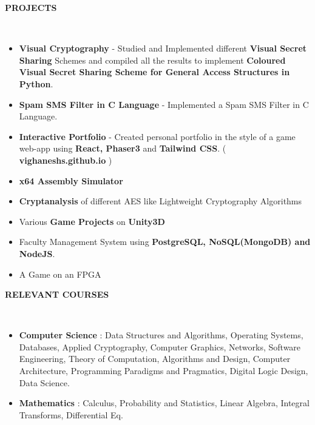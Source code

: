 \documentclass[a4paper,10pt]{article}
\newcommand{\lsep}{-0.6cm}
\newcommand{\resheading}[1]{{\small \colorbox{mygrey}{\begin{minipage}{0.975\textwidth}{\textbf{#1 \vphantom{p\^{E}}}}\end{minipage}}}}
\begin{document}
\resheading{\textbf{PROJECTS} }\\[\lsep]
\vspace{1.0pt}
\begin{itemize}
\setlength{\itemsep}{1pt}
\setlength{\parskip}{0pt}
\setlength{\parsep}{0pt}
\item \textbf{Visual Cryptography} - Studied and Implemented different \textbf{Visual Secret Sharing} Schemes and compiled all the results to implement \textbf{Coloured Visual Secret Sharing Scheme for General Access Structures in Python}. 	
\item \textbf{Spam SMS Filter in C Language} - Implemented a Spam SMS Filter in C Language.
\item \textbf{Interactive Portfolio} - Created personal portfolio in the style of a game web-app using \textbf{React, Phaser3} and \textbf{Tailwind CSS}. (\textbf{ vighaneshs.github.io} )
\item \textbf{x64 Assembly Simulator}
\item \textbf{Cryptanalysis} of different AES like Lightweight Cryptography Algorithms
\item Various \textbf{Game Projects} on \textbf{Unity3D}
\item Faculty Management System using \textbf{PostgreSQL, NoSQL(MongoDB) and NodeJS}.
\item A Game on an FPGA
\end{itemize}
\vspace{-5pt}

\resheading{\textbf{RELEVANT COURSES} }\\[\lsep]
\vspace{1.0pt}
\begin{itemize}[itemsep=0.1pt]
\item \noindent \textbf{Computer Science} : Data Structures and Algorithms, Operating Systems, Databases, Applied Cryptography, Computer Graphics, Networks, Software Engineering, Theory of Computation,  Algorithms and Design, Computer Architecture,
Programming Paradigms and Pragmatics, Digital Logic Design, Data Science.
\item \noindent \textbf{Mathematics} : Calculus, Probability and Statistics, Linear Algebra, Integral Transforms, Differential Eq.
\end{itemize}
\end{document}
